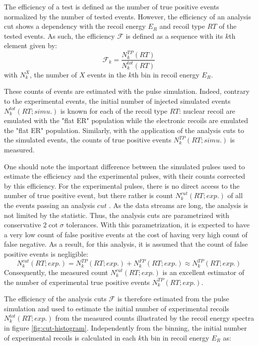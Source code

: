 The efficiency of a test is defined as the number of true positive events normalized by the number of tested events. However, the efficiency of an analysis cut shows a dependency with the recoil energy $E_R$ and recoil type $RT$ of the tested events. As such, the efficiency $\mathcal{F}$ is defined as a sequence with its $k$th element given by:
\begin{equation}
\mathcal{F}_k
=
\frac{ N_k^{TP} (RT)}{ N_k^{tot} (RT)}
\end{equation}
with $N_k^X$, the number of $X$ events in the $k$th bin in recoil energy $E_R$. 

These counts of events are estimated with the pulse simulation. Indeed, contrary to the experimental events, the initial number of injected simulated events $N_k^{tot} (RT; simu.)$ is known for each of the recoil type $RT$: nuclear recoil are emulated with the "flat ER" population while the electronic recoils are emulated the "flat ER" population. Similarly, with the application of the analysis cuts to the simulated events, the counts of true positive events $N_k^{TP} (RT; simu.)$ is measured.

One should note the important difference between the simulated pulses used to estimate the efficiency and the experimental pulses, with their counts corrected by this efficiency. For the experimental pulses, there is no direct access to the number of true positive event, but there rather is count $N_k^{cut} (RT; exp.)$ of all the events passing an analysis $cut$ . As the data streams are long, the analysis is not limited by the statistic. Thus, the analysis cuts are parametrized with conservative $2 \cot \sigma$ tolerances.  With this parametrization, it is expected to have a very low count of false positive events at the cost of having very high count of false negative. As a result, for this analysis, it is assumed that the count of false positive events is negligible:
\begin{equation}
N_k^{cut} (RT; exp.) = N_k^{TP} (RT; exp.) + N_k^{FP} (RT; exp.) \approx N_k^{TP} (RT; exp.)
\end{equation}
Consequently, the measured count $N_k^{cut} (RT; exp.)$ is an excellent estimator of the number of experimental true positive events $N_k^{TP} (RT; exp.)$.

The efficiency of the analysis cuts $\mathcal{F}$ is therefore estimated from the pulse simulation and used to estimate the initial number of experimental recoils $N_k^{tot} (RT; exp.)$ from the measured counts illustrated by the recoil energy spectra in figure \ref{fig:cut-histogram}. Independently from the binning, the initial number of experimental recoils is calculated in each $k$th bin in recoil energy $E_R$ as:

